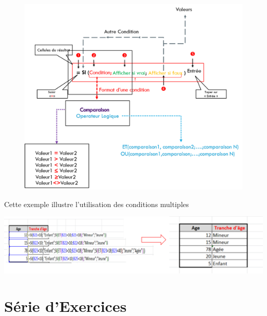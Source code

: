 \begin{figure}[H]
	\centering
	\includegraphics[scale=0.2,width= \linewidth]{img/condition_multiple}
\end{figure}

\begin{Exemple}
	Cette exemple illustre l'utilisation des conditions multiples
\end{Exemple}
\begin{center}  
	\includegraphics[scale=0.2,width=\linewidth]{img/condition_multiple_exemple}
\end{center}

\section{Série d'Exercices}

